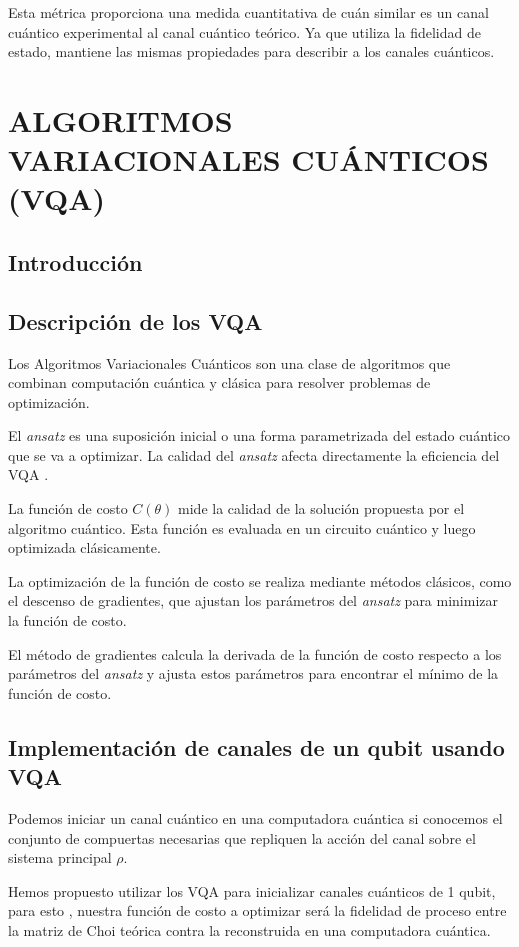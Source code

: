 \documentclass[letterpaper,12pt]{thesisECFM}
\theoremstyle{plain}
\theoremstyle{definition}
\theoremstyle{definition}
\theoremstyle{remark}
\newcommand{\1}{\mathbb{1}}
\begin{document}
Esta métrica proporciona una medida cuantitativa de cuán similar es un canal cuántico experimental al canal cuántico teórico. Ya que utiliza la fidelidad de estado, mantiene las mismas propiedades para describir a los canales cuánticos. 

\chapter{ALGORITMOS VARIACIONALES CUÁNTICOS (VQA)} %
\section{Introducción}
\section{Descripción de los VQA}
Los Algoritmos Variacionales Cuánticos son una clase de algoritmos que combinan computación cuántica y clásica para resolver problemas de optimización.  

El \textit{ansatz} es una suposición inicial o una forma parametrizada del estado cuántico que se va a optimizar. La calidad del \textit{ansatz} afecta directamente la eficiencia del VQA .  

La función de costo $C(\theta)$ mide la calidad de la solución propuesta por el algoritmo cuántico. Esta función es evaluada en un circuito cuántico y luego optimizada clásicamente.  

La optimización de la función de costo se realiza mediante métodos clásicos, como el descenso de gradientes, que ajustan los parámetros del \textit{ansatz} para minimizar la función de costo.  
 
El método de gradientes calcula la derivada de la función de costo respecto a los parámetros del \textit{ansatz} y ajusta estos parámetros para encontrar el mínimo de la función de costo.  

\section{Implementación de canales de un qubit usando VQA}
Podemos iniciar un canal cuántico en una computadora cuántica si conocemos el conjunto de compuertas necesarias que repliquen la acción del canal sobre el sistema principal $\rho$.  

Hemos propuesto utilizar los VQA para inicializar canales cuánticos de 1 qubit, para esto , nuestra función de costo a optimizar será la fidelidad de proceso entre la matriz de Choi teórica contra la reconstruida en una computadora cuántica.  
 
\end{document}
